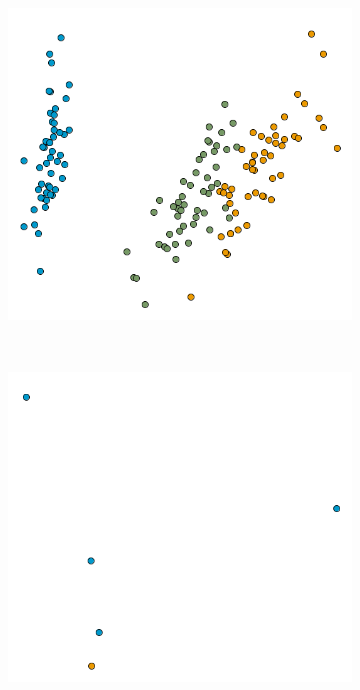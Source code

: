 \begin{figure}[h!]
    \centering
    \begin{subfigure}[b]{0.45\textwidth}
        \begin{framed}
            \centering
            \includegraphics[width=\textwidth]{images/dual1.png}
        \end{framed}
        \caption{}
    \end{subfigure}%
    ~
    \begin{subfigure}[b]{0.45\textwidth}
        \begin{framed}
            \centering
            \includegraphics[width=\textwidth]{images/dual2.png}

\end{framed}
\end{subfigure}
\end{figure}
